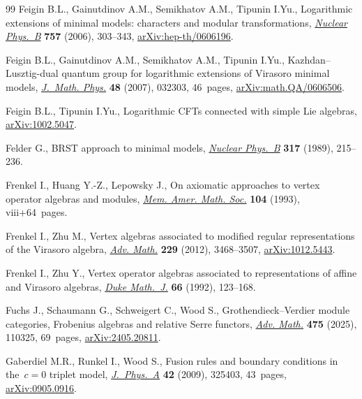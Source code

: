 \documentclass[pdftex]{sigma}
\numberwithin{equation}{section}
\theoremstyle{definition}
\begin{document}
\begin{thebibliography}{99}
Feigin B.L., Gainutdinov A.M., Semikhatov A.M., Tipunin I.Yu., Logarithmic
 extensions of minimal models: characters and modular transformations,
 \href{https://doi.org/10.1016/j.nuclphysb.2006.09.019}{\textit{Nuclear
 Phys.~B}} \textbf{757} (2006), 303--343,
 \href{http://arxiv.org/abs/hep-th/0606196}{arXiv:hep-th/0606196}.

Feigin B.L., Gainutdinov A.M., Semikhatov A.M., Tipunin I.Yu.,
 Kazhdan--{L}usztig-dual quantum group for logarithmic extensions of
 {V}irasoro minimal models,
 \href{https://doi.org/10.1063/1.2423226}{\textit{J.~Math. Phys.}} \textbf{48}
 (2007), 032303, 46~pages,
 \href{http://arxiv.org/abs/math.QA/0606506}{arXiv:math.QA/0606506}.

Feigin B.L., Tipunin I.Yu., Logarithmic {CFT}s connected with simple {L}ie
 algebras, \href{http://arxiv.org/abs/1002.5047}{arXiv:1002.5047}.

Felder G., B{RST} approach to minimal models,
 \href{https://doi.org/10.1016/0550-3213(89)90568-3}{\textit{Nuclear Phys.~B}}
 \textbf{317} (1989), 215--236.

Frenkel I., Huang Y.-Z., Lepowsky J., On axiomatic approaches to vertex operator
 algebras and modules, \href{https://doi.org/10.1090/memo/0494}{\textit{Mem.
 Amer. Math. Soc.}} \textbf{104} (1993), viii+64~pages.

Frenkel I., Zhu M., Vertex algebras associated to modified regular
 representations of the {V}irasoro algebra,
 \href{https://doi.org/10.1016/j.aim.2012.02.008}{\textit{Adv. Math.}}
 \textbf{229} (2012), 3468--3507,
 \href{http://arxiv.org/abs/1012.5443}{arXiv:1012.5443}.

Frenkel I., Zhu Y., Vertex operator algebras associated to representations of
 affine and {V}irasoro algebras,
 \href{https://doi.org/10.1215/S0012-7094-92-06604-X}{\textit{Duke Math.~J.}}
 \textbf{66} (1992), 123--168.

Fuchs J., Schaumann G., Schweigert C., Wood S., Grothendieck--{V}erdier module
 categories, {F}robenius algebras and relative {S}erre functors,
 \href{https://doi.org/10.1016/j.aim.2025.110325}{\textit{Adv. Math.}}
 \textbf{475} (2025), 110325, 69~pages,
 \href{http://arxiv.org/abs/2405.20811}{arXiv:2405.20811}.

Gaberdiel M.R., Runkel I., Wood S., Fusion rules and boundary conditions in
 the~{$c=0$} triplet model,
 \href{https://doi.org/10.1088/1751-8113/42/32/325403}{\textit{J.~Phys.~A}}
 \textbf{42} (2009), 325403, 43~pages,
 \href{http://arxiv.org/abs/0905.0916}{arXiv:0905.0916}.


\end{thebibliography}
\end{document}
